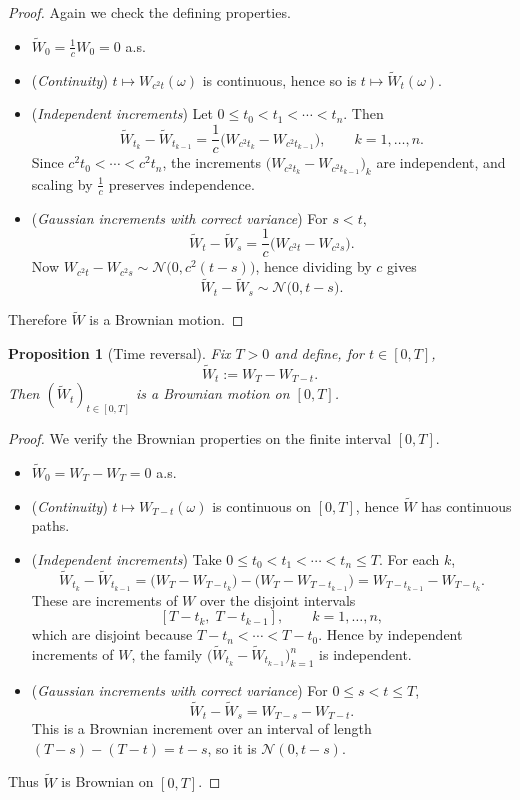 \documentclass[11pt]{article}
\newtheorem{proposition}[theorem]{Proposition}
\theoremstyle{definition}
\theoremstyle{remark}
\begin{document}
\begin{proof}
Again we check the defining properties.
\begin{itemize}[leftmargin=1.5em]
\item $\widetilde W_0=\frac1c W_0=0$ a.s.
\item (\emph{Continuity}) $t\mapsto W_{c^2 t}(\omega)$ is continuous, hence so is $t\mapsto \widetilde W_t(\omega)$.
\item (\emph{Independent increments}) Let $0\le t_0<t_1<\cdots<t_n$.
Then
\[
\widetilde W_{t_k}-\widetilde W_{t_{k-1}}
=\frac1c\Big(W_{c^2 t_k}-W_{c^2 t_{k-1}}\Big),\qquad k=1,\dots,n.
\]
Since $c^2 t_0<\cdots<c^2 t_n$, the increments
$\big(W_{c^2 t_k}-W_{c^2 t_{k-1}}\big)_k$ are independent, and scaling by $\frac1c$ preserves independence.
\item (\emph{Gaussian increments with correct variance}) For $s<t$,
\[
\widetilde W_t-\widetilde W_s=\frac1c\big(W_{c^2 t}-W_{c^2 s}\big).
\]
Now $W_{c^2 t}-W_{c^2 s}\sim \mathcal N\big(0,c^2(t-s)\big)$, hence dividing by $c$ gives
\[
\widetilde W_t-\widetilde W_s\sim \mathcal N\big(0,t-s\big).
\]
\end{itemize}
Therefore $\widetilde W$ is a Brownian motion.
\end{proof}


\begin{proposition}[Time reversal]
Fix $T>0$ and define, for $t\in[0,T]$,
\[
\widetilde W_t:=W_T-W_{T-t}.
\]
Then $(\widetilde W_t)_{t\in[0,T]}$ is a Brownian motion on $[0,T]$.
\end{proposition}

\begin{proof}
We verify the Brownian properties on the finite interval $[0,T]$.
\begin{itemize}[leftmargin=1.5em]
\item $\widetilde W_0=W_T-W_T=0$ a.s.
\item (\emph{Continuity}) $t\mapsto W_{T-t}(\omega)$ is continuous on $[0,T]$, hence $\widetilde W$ has continuous paths.
\item (\emph{Independent increments}) Take $0\le t_0<t_1<\cdots<t_n\le T$.
For each $k$,
\[
\widetilde W_{t_k}-\widetilde W_{t_{k-1}}
=\big(W_T-W_{T-t_k}\big)-\big(W_T-W_{T-t_{k-1}}\big)
= W_{T-t_{k-1}}-W_{T-t_k}.
\]
These are increments of $W$ over the disjoint intervals
\[
[T-t_k,\;T-t_{k-1}],\qquad k=1,\dots,n,
\]
which are disjoint because $T-t_n<\cdots<T-t_0$.
Hence by independent increments of $W$, the family
$\big(\widetilde W_{t_k}-\widetilde W_{t_{k-1}}\big)_{k=1}^n$ is independent.
\item (\emph{Gaussian increments with correct variance}) For $0\le s<t\le T$,
\[
\widetilde W_t-\widetilde W_s
= W_{T-s}-W_{T-t}.
\]
This is a Brownian increment over an interval of length $(T-s)-(T-t)=t-s$,
so it is $\mathcal N(0,t-s)$.
\end{itemize}
Thus $\widetilde W$ is Brownian on $[0,T]$.
\end{proof}
\end{document}
